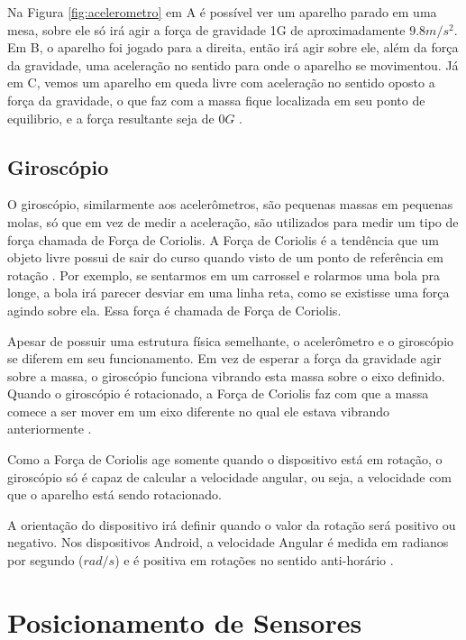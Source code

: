 	
Na Figura \ref{fig:acelerometro} em A é possível ver um aparelho parado em uma mesa, sobre ele só irá agir a força de gravidade 1G de aproximadamente $9.8 m/s^{2}$. Em  B, o aparelho foi jogado para a direita, então irá agir sobre ele, além da força da gravidade, uma aceleração no sentido para onde o aparelho se movimentou. Já em C, vemos um aparelho em queda livre com aceleração no sentido oposto a força da gravidade, o que faz com a massa fique localizada em seu ponto de equilibrio, e a força resultante  seja de $0G$ \citep{milette2012professional}.


\subsection{Giroscópio}
	
	O giroscópio, similarmente aos acelerômetros, são pequenas massas em pequenas molas, só que em vez de medir a aceleração, são utilizados para medir um tipo de força chamada de Força de Coriolis. A Força de Coriolis é a tendência que um objeto livre possui de sair do curso quando visto de um ponto de referência em rotação \citep{milette2012professional}. Por exemplo, se sentarmos em um carrossel e rolarmos uma bola pra longe, a bola irá parecer desviar em uma linha reta, como se existisse uma força agindo sobre ela. Essa força é chamada de Força de Coriolis.
	
	Apesar de possuir uma estrutura física semelhante, o acelerômetro e o giroscópio se diferem em seu funcionamento. Em vez de esperar a força da gravidade agir sobre a massa, o giroscópio funciona vibrando esta massa sobre o eixo definido. Quando o giroscópio é rotacionado, a Força de Coriolis faz com que a massa comece a ser mover em um eixo diferente no qual ele estava vibrando anteriormente \cite{milette2012professional}.
	
	Como a Força de Coriolis age somente quando o dispositivo está em rotação, o giroscópio só é capaz de calcular a velocidade angular, ou seja, a velocidade com que o aparelho está sendo rotacionado. 
	
	A orientação do dispositivo irá definir quando o valor da rotação será positivo ou negativo. Nos dispositivos Android, a velocidade Angular é medida em radianos por segundo ($rad/s$) e é positiva em rotações no sentido anti-horário \citep{GyroscopeAndroidDocs}. 
	
\section{Posicionamento de Sensores}
\label{sec:sensor_position}


